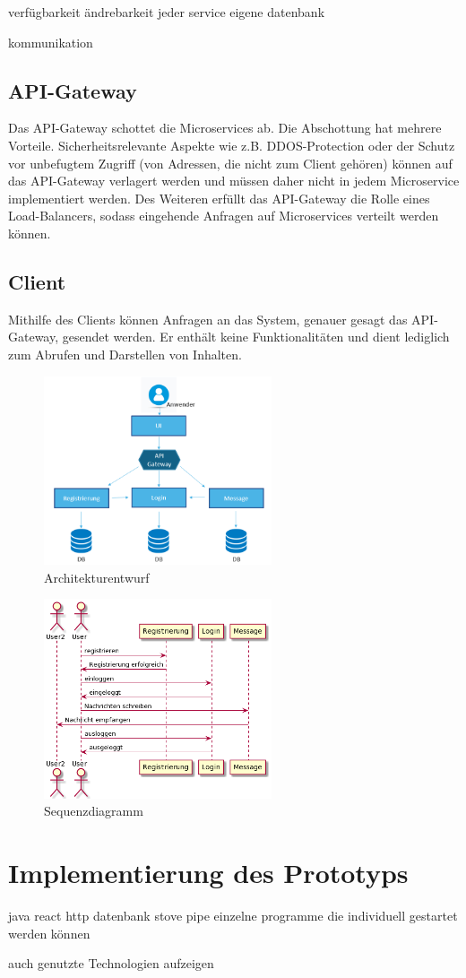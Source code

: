 verfügbarkeit
ändrebarkeit
jeder service eigene datenbank

kommunikation

\subsection{API-Gateway}
Das API-Gateway schottet die Microservices ab. Die Abschottung hat mehrere Vorteile. Sicherheitsrelevante Aspekte wie z.B. DDOS-Protection oder der Schutz vor unbefugtem Zugriff (von Adressen, die nicht zum Client gehören) können auf das API-Gateway verlagert werden und müssen daher nicht in jedem Microservice implementiert werden.
Des Weiteren erfüllt das API-Gateway die Rolle eines Load-Balancers, sodass eingehende Anfragen auf Microservices verteilt werden können.

\subsection{Client}
Mithilfe des Clients können Anfragen an das System, genauer gesagt das API-Gateway, gesendet werden. Er enthält keine Funktionalitäten und dient lediglich zum Abrufen und Darstellen von Inhalten.


\begin{figure}[bth] 
	\centering
	\includegraphics[width=0.6\textwidth]{Graphics/Architekturentwurf.png}
	\caption{Architekturentwurf}
\end{figure}

\begin{figure}[bth] 
	\centering
	\includegraphics[width=0.6\textwidth]{Graphics/Sequenzdiagramm.png}
	\caption{Sequenzdiagramm}
\end{figure}

\section{Implementierung des Prototyps}
java
react
http
datenbank
stove pipe
einzelne programme die individuell gestartet werden können

auch genutzte Technologien aufzeigen

